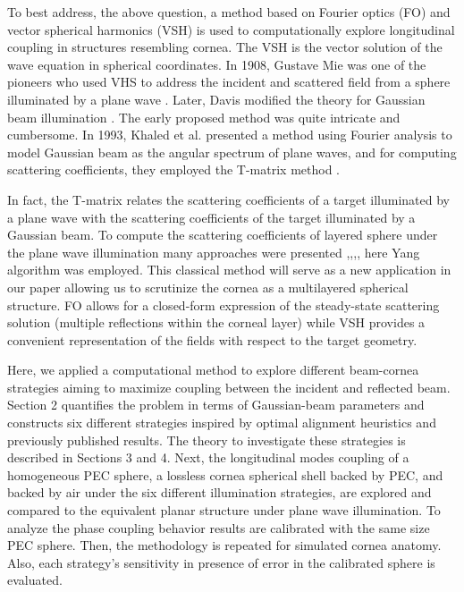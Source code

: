 \documentclass{osa-article}
\begin{document}
To best address, the above question, a method based on Fourier optics (FO) and vector spherical harmonics (VSH) is used to computationally explore longitudinal coupling in structures resembling cornea. The VSH is the vector solution of the wave equation in spherical coordinates. In 1908, Gustave Mie was one of the pioneers who used VHS to address the incident and scattered field from a sphere illuminated by a plane wave \cite{Mie}. Later, Davis modified the theory for Gaussian beam illumination \cite{davis}. The early proposed method was quite intricate and cumbersome. In 1993, Khaled et al. \cite{esam93} presented a method using Fourier analysis \cite{goodman} to model Gaussian beam as the angular spectrum of plane waves, and for computing scattering coefficients, they employed the T-matrix method \cite{barber}.

In fact, the T-matrix relates the scattering coefficients of a target illuminated by a plane wave with the scattering coefficients of the target illuminated by a Gaussian beam. To compute the scattering coefficients of layered sphere under the plane wave illumination many approaches were presented \cite{Toon},\cite{bohrn},\cite{pena},\cite{Yang}, here Yang \cite{Yang} algorithm was employed. This classical method will serve as a new application in our paper allowing us to scrutinize the cornea as a multilayered spherical structure. FO allows for a closed-form expression of the steady-state scattering solution (multiple reflections within the corneal layer) while VSH provides a convenient representation of the fields with respect to the target geometry.

Here, we applied a computational method to explore different beam-cornea strategies aiming to maximize coupling between the incident and reflected beam. Section 2 quantifies the problem in terms of Gaussian-beam parameters and constructs six different strategies inspired by optimal alignment heuristics and previously published results. The theory to investigate these strategies is described in Sections 3 and 4. Next, the longitudinal modes coupling of a homogeneous PEC sphere, a lossless cornea spherical shell backed by PEC, and backed by air under the six different illumination strategies, are explored and compared to the equivalent planar structure under plane wave illumination. To analyze the phase coupling behavior results are calibrated with the same size PEC sphere. Then, the methodology is repeated for simulated cornea anatomy. Also, each strategy's sensitivity in presence of error in the calibrated sphere is evaluated.
\end{document}
